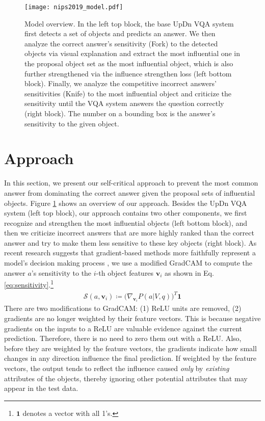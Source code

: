 \documentclass{article}
\begin{document}
\begin{figure}[!t]
    \centering
    \texttt{[image: nips2019\_model.pdf]}
    \caption{Model overview. In the left top block, the base UpDn VQA system first detects a set of objects and predicts an answer. We then analyze the correct answer's sensitivity (Fork) to the detected objects via visual explanation and extract the most influential one in the proposal object set as the most influential object, which is also further strengthened via the influence strengthen loss (left bottom block). Finally, we analyze the competitive incorrect answers' sensitivities (Knife) to the most influential object and criticize the sensitivity until the VQA system answers the question correctly (right block). The number on a bounding box is the answer's sensitivity to the given object.}
    \label{fig:model_overview}
\end{figure}

\section{Approach}
In this section, we present our self-critical approach to prevent the most common answer from dominating the correct answer given the proposal sets of influential objects. Figure \ref{fig:model_overview} shows an overview of our approach. Besides the UpDn VQA system (left top block), our approach contains two other components, we first recognize and strengthen the most influential objects (left bottom block), and then we criticize incorrect answers that are more highly ranked than the correct answer and try to make them less sensitive to these key objects (right block). As recent research suggests that gradient-based methods more faithfully represent a model's decision making process \cite{selvaraju2019taking,zhang2018top,wu2018dynamic,jain2019attention}, we use a modified GradCAM \cite{selvaraju2017grad} to compute the answer $a$'s sensitivity to the $i$-th object features $\textbf{v}_i$ as shown in Eq. \ref{eq:sensitivity}.\footnote{$\mathbf{1}$ denotes a vector with all 1's. }
\begin{align}
\mathcal{S}(a, \textbf{v}_i)  \coloneqq \big (\nabla_{\textbf{v}_i} P(a| V, q) \big)^T \mathbf{1} \label{eq:sensitivity}
\end{align}
There are two modifications to GradCAM: (1) ReLU units are removed, (2) gradients are no longer weighted by their feature vectors. This is because negative gradients on the inputs to a ReLU are valuable evidence against the current prediction. Therefore, there is no need to zero them out with a ReLU. Also, before they are weighted by the feature vectors, the gradients indicate how small changes in any direction influence the final prediction. If weighted by the feature vectors, the output tends to reflect the influence caused {\it only} by {\it existing} attributes of the objects, thereby ignoring other potential attributes that may appear in the test data.
\end{document}
